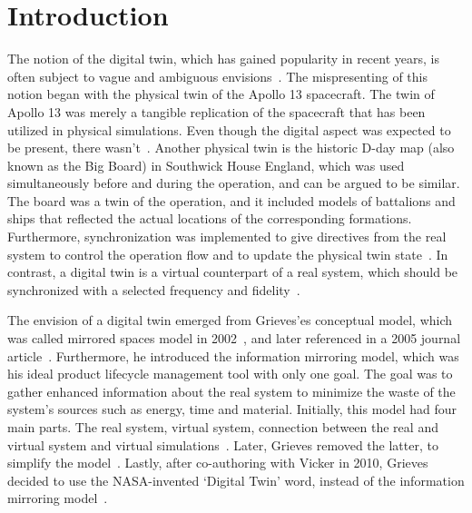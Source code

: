 \documentclass{llncs}
\begin{document}
    \section{Introduction}\label{section:introduction}
    The notion of the digital twin, which has gained popularity in recent years, is often subject to vague and ambiguous envisions~\cite{Review1}.
    The mispresenting of this notion began with the physical twin of the Apollo 13 spacecraft. 
    The twin of Apollo 13 was merely a tangible replication of the spacecraft that has been utilized in physical simulations. 
    Even though the digital aspect was expected to be present, there wasn't~\cite{GrievesMichaelApolloMyth}.
    Another physical twin is the historic D-day map (also known as the Big Board) in Southwick House England, 
    which was used simultaneously before and during the operation, and can be argued to be similar. 
    The board was a twin of the operation, and it included models of battalions and ships that reflected the actual 
    locations of the corresponding formations. Furthermore, synchronization was 
    implemented to give directives from the real system to control the operation 
    flow and to update the physical twin state~\cite{AMRC}.
    In contrast, a digital twin is a virtual counterpart of a real system, which should 
    be synchronized with a selected frequency and fidelity~\cite{Review1,Review2,digitaltwinconsortium2022}.

    The envision of a digital twin emerged from Grieves'es conceptual model, which was called mirrored spaces model in 2002~\cite{Originsofdigitaltwinconcept},
    and later referenced in a 2005 journal article~\cite{2005ArticleGrievesMichael}. 
    Furthermore, he introduced the information mirroring model, which was his ideal product lifecycle management tool with only one goal. 
    The goal was to gather enhanced information about the real system to minimize the waste of the system's sources such as energy, 
    time and material. Initially, this model had four main parts. The real system, 
    virtual system, connection between the real and virtual system and virtual simulations~\cite{GrievesPLMBook}. 
    Later, Grieves removed the latter, to simplify the model~\cite{Originsofdigitaltwinconcept}. Lastly, after co-authoring with Vicker in 2010, 
    Grieves decided to use the NASA-invented `Digital Twin' word, instead of the information mirroring model~\cite{Originsofdigitaltwinconcept}.
\end{document}
